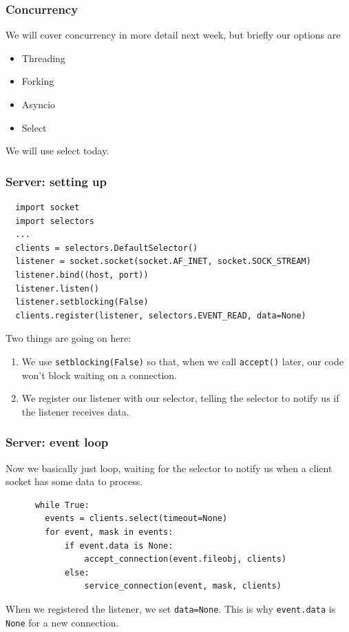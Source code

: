 \documentclass[10pt]{beamer}
\begin{document}
\begin{frame}
  \frametitle{Concurrency}
  
  We will cover concurrency in more detail next week, but briefly our options
  are
  \begin{itemize}
    \item Threading
    \item Forking
    \item Asyncio
    \item Select
  \end{itemize}   
  
  We will use select today.   
\end{frame}
\begin{frame}[fragile]
  \frametitle{Server: setting up}
  
 
  \begin{verbatim}
  import socket
  import selectors
  ...
  clients = selectors.DefaultSelector()
  listener = socket.socket(socket.AF_INET, socket.SOCK_STREAM)
  listener.bind((host, port))
  listener.listen()
  listener.setblocking(False)
  clients.register(listener, selectors.EVENT_READ, data=None)
  \end{verbatim} 
  Two things are going on here:
  \begin{enumerate}
    \item We use \texttt{setblocking(False)} so that, when we call \texttt{accept()} later,
    our code won't block waiting on a connection.
    \item We register our listener with our selector, telling the selector to notify us if the listener
    receives data.
  \end{enumerate}  
  
   
\end{frame}
\begin{frame}[fragile]
  \frametitle{Server: event loop}
  
  Now we basically just loop, waiting for the selector to notify
  us when a client socket has some data to process.
  
  \begin{verbatim}
      while True:
        events = clients.select(timeout=None)
        for event, mask in events:
            if event.data is None:
                accept_connection(event.fileobj, clients)
            else:
                service_connection(event, mask, clients)  
  \end{verbatim} 
  
  When we registered the listener, we set \texttt{data=None}. This is why
  \texttt{event.data} is \texttt{None} for a new connection.
  
   
\end{frame}
\end{document}
